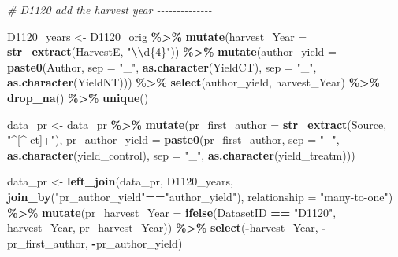 \documentclass[
]{article}
\newenvironment{Shaded}{\begin{snugshade}}{\end{snugshade}}
\newcommand{\AttributeTok}[1]{\textcolor[rgb]{0.13,0.29,0.53}{#1}}
\newcommand{\CommentTok}[1]{\textcolor[rgb]{0.56,0.35,0.01}{\textit{#1}}}
\newcommand{\FunctionTok}[1]{\textcolor[rgb]{0.13,0.29,0.53}{\textbf{#1}}}
\newcommand{\NormalTok}[1]{#1}
\newcommand{\OtherTok}[1]{\textcolor[rgb]{0.56,0.35,0.01}{#1}}
\newcommand{\SpecialCharTok}[1]{\textcolor[rgb]{0.81,0.36,0.00}{\textbf{#1}}}
\newcommand{\StringTok}[1]{\textcolor[rgb]{0.31,0.60,0.02}{#1}}
\begin{document}
\begin{Shaded}
\begin{Highlighting}[]
\CommentTok{\# D1120 add the harvest year {-}{-}{-}{-}{-}{-}{-}{-}{-}{-}{-}{-}{-}{-}}

\NormalTok{D1120\_years }\OtherTok{\textless{}{-}} 
\NormalTok{  D1120\_orig }\SpecialCharTok{\%\textgreater{}\%} 
  \FunctionTok{mutate}\NormalTok{(}\AttributeTok{harvest\_Year =} \FunctionTok{str\_extract}\NormalTok{(HarvestE, }\StringTok{"}\SpecialCharTok{\textbackslash{}\textbackslash{}}\StringTok{d\{4\}"}\NormalTok{)) }\SpecialCharTok{\%\textgreater{}\%} 
  \FunctionTok{mutate}\NormalTok{(}\AttributeTok{author\_yield =} \FunctionTok{paste0}\NormalTok{(Author, }\AttributeTok{sep =} \StringTok{"\_"}\NormalTok{, }\FunctionTok{as.character}\NormalTok{(YieldCT), }\AttributeTok{sep =} \StringTok{"\_"}\NormalTok{, }\FunctionTok{as.character}\NormalTok{(YieldNT))) }\SpecialCharTok{\%\textgreater{}\%} 
  \FunctionTok{select}\NormalTok{(author\_yield, harvest\_Year) }\SpecialCharTok{\%\textgreater{}\%}
  \FunctionTok{drop\_na}\NormalTok{() }\SpecialCharTok{\%\textgreater{}\%} 
  \FunctionTok{unique}\NormalTok{()  }

\NormalTok{data\_pr  }\OtherTok{\textless{}{-}} 
\NormalTok{data\_pr }\SpecialCharTok{\%\textgreater{}\%}   
  \FunctionTok{mutate}\NormalTok{(}\AttributeTok{pr\_first\_author =} \FunctionTok{str\_extract}\NormalTok{(Source, }\StringTok{"\^{}[\^{} et]+"}\NormalTok{),}
         \AttributeTok{pr\_author\_yield =} \FunctionTok{paste0}\NormalTok{(pr\_first\_author, }\AttributeTok{sep =} \StringTok{"\_"}\NormalTok{, }\FunctionTok{as.character}\NormalTok{(yield\_control), }\AttributeTok{sep =} \StringTok{"\_"}\NormalTok{, }\FunctionTok{as.character}\NormalTok{(yield\_treatm)))}

\NormalTok{data\_pr }\OtherTok{\textless{}{-}}   
  \FunctionTok{left\_join}\NormalTok{(data\_pr, D1120\_years, }\FunctionTok{join\_by}\NormalTok{(}\StringTok{"pr\_author\_yield"}\SpecialCharTok{==}\StringTok{"author\_yield"}\NormalTok{), }\AttributeTok{relationship =} \StringTok{"many{-}to{-}one"}\NormalTok{) }\SpecialCharTok{\%\textgreater{}\%} 
  \FunctionTok{mutate}\NormalTok{(}\AttributeTok{pr\_harvest\_Year =} \FunctionTok{ifelse}\NormalTok{(DatasetID }\SpecialCharTok{==} \StringTok{"D1120"}\NormalTok{, harvest\_Year, pr\_harvest\_Year)) }\SpecialCharTok{\%\textgreater{}\%} 
  \FunctionTok{select}\NormalTok{(}\SpecialCharTok{{-}}\NormalTok{harvest\_Year, }\SpecialCharTok{{-}}\NormalTok{pr\_first\_author, }\SpecialCharTok{{-}}\NormalTok{pr\_author\_yield)}
\end{Highlighting}
\end{Shaded}
\end{document}
